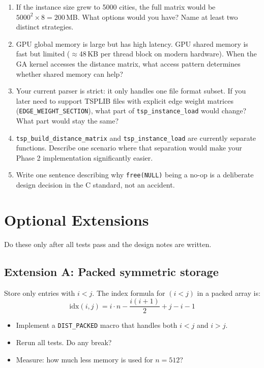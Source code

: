 \begin{enumerate}[label=\arabic*., itemsep=6pt]
  \item If the instance size grew to 5000 cities, the full matrix would be $5000^2 \times 8 = 200$\,MB. What options would you have? Name at least two distinct strategies.

  \item GPU global memory is large but has high latency. GPU shared memory is fast but limited ($\approx$48\,KB per thread block on modern hardware). When the GA kernel accesses the distance matrix, what access pattern determines whether shared memory can help?

  \item Your current parser is strict: it only handles one file format subset. If you later need to support TSPLIB files with explicit edge weight matrices (\texttt{EDGE\_WEIGHT\_SECTION}), what part of \texttt{tsp\_instance\_load} would change? What part would stay the same?

  \item \texttt{tsp\_build\_distance\_matrix} and \texttt{tsp\_instance\_load} are currently separate functions. Describe one scenario where that separation would make your Phase 2 implementation significantly easier.

  \item Write one sentence describing why \texttt{free(NULL)} being a no-op is a deliberate design decision in the C standard, not an accident.
\end{enumerate}

\section{Optional Extensions}

Do these only after all tests pass and the design notes are written.

\subsection*{Extension A: Packed symmetric storage}
Store only entries with $i < j$. The index formula for $(i < j)$ in a packed array is:
\[
\text{idx}(i,j) = i \cdot n - \frac{i(i+1)}{2} + j - i - 1
\]
\begin{itemize}
  \item Implement a \texttt{DIST\_PACKED} macro that handles both $i < j$ and $i > j$.
  \item Rerun all tests. Do any break?
  \item Measure: how much less memory is used for $n = 512$?
\end{itemize}

